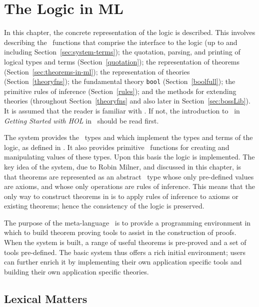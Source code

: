 \chapter{The \HOL{} Logic in ML}\label{HOLsyschapter}

In this chapter, the concrete representation of the \HOL{} logic is
described.  This involves describing the \ML\ functions that comprise
the interface to the logic (up to and including
Section~\ref{sec:system-terms}); the quotation, parsing, and printing of
logical types and terms (Section~\ref{quotation}); the representation of
theorems (Section~\ref{sec:theorems-in-ml}); the representation of theories
(Section~\ref{theoryfns}); the fundamental \HOL{} theory \texttt{bool}
(Section~\ref{boolfull}); the primitive rules of inference
(Section~\ref{rules}); and the methods for extending theories
(throughout Section~\ref{theoryfns} and also later in
Section~\ref{sec:bossLib}).  It is assumed that the reader is familiar
with \ML.  If not, the introduction to \ML\ in {\sl Getting Started
with HOL\/} in \TUTORIAL\ should be read first.

The \HOL{} system provides the \ML\ types  and 
which implement the types and terms of the \HOL{} logic, as defined in
\LOGIC. It also provides primitive \ML\ functions for creating and
manipulating values of these types. Upon this basis the \HOL{} logic
is implemented. The key idea of the \HOL{} system, due to Robin
Milner, and discussed in this chapter, is that
theorems are represented as an abstract \ML\ type whose only
pre-defined values are axioms, and whose only operations are rules of
inference. This means that the only way to construct theorems in
\HOL{} is to apply rules of inference to axioms or existing theorems;
hence the consistency of the logic is preserved.

The purpose of the meta-language \ML\ is to provide a programming
environment in which to build theorem proving tools to assist in the
construction of proofs.  When the \HOL{} system is built, a range of
useful theorems is pre-proved and a set of tools pre-defined. The basic
system thus offers a rich initial environment; users can further enrich
it by implementing their own application specific tools and building
their own application specific theories.


\section{Lexical Matters}\label{HOL-lex}

